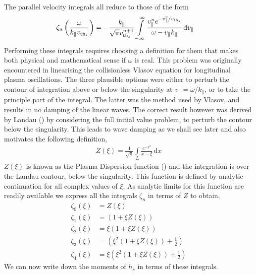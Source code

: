 \documentclass[prb,aps,amssymb,amsmath,a4paper]{revtex4}
\begin{document}
The parallel velocity integrals all reduce to those of the form
\begin{align}
\zeta_n\left(\frac{\omega}{k_\parallel v_{\mathrm{th}_s}}\right) &= - \frac{k_\parallel}{\sqrt{\pi}v_{\mathrm{th}_s}^{n+1}} \int\limits_{-\infty}^\infty \frac{v^n_\parallel e^{-v_\parallel^2/v_{\mathrm{th}_s}}}{\omega - v_\parallel k_\parallel } \,\mathrm{d}v_\parallel
\end{align}
Performing these integrals requires choosing a definition for them that makes both physical and mathematical sense if $\omega$ is real. This problem was originally encountered in linearising the collisionless Vlasov equation for longitudinal plasma oscillations. The three plausible options were either to perturb the contour of integration above or below the singularity at $v_\parallel = \omega / k_\parallel$, or to take the principle part of the integral. The latter was the method used by Vlasov, and results in no damping of the linear waves. The correct result however was derived by Landau (\cite{landau}) by considering the full initial value problem, to perturb the contour below the singularity. This leads to wave damping as we shall see later and also motivates the following definition,
\begin{align}
Z(\xi) = \frac{1}{\sqrt{\pi}} \int\limits_L \frac{e^{-x^2}}{x - \xi} \,\mathrm{d}x
\end{align}
$Z(\xi)$ is known as the Plasma Dispersion function (\cite{fried1961pdf}) and the integration is over the Landau contour, below the singularity. This function is defined by analytic continuation for all complex values of $\xi$. As analytic limits for this function are readily available we express all the integrals $\zeta_n$ in terms of $Z$ to obtain,
\begin{align}
\zeta_0\left(\xi\right) &= Z\left( \xi\right)
\\
\zeta_1\left(\xi\right) &= \left( 1 + \xi Z(\xi) \right)
\\
\zeta_2\left(\xi\right) &= \xi \left( 1 + \xi Z(\xi) \right)
\\
\zeta_3\left(\xi\right) &= \left( \xi^2 \left(1 + \xi Z(\xi)\right) + \frac{1}{2} \right)
\\
\zeta_4\left(\xi\right) &= \xi  \left( \xi^2 \left(1 + \xi Z(\xi)\right) + \frac{1}{2} \right)
\end{align}
We can now write down the moments of $h_s$ in terms of these integrals.
\end{document}
